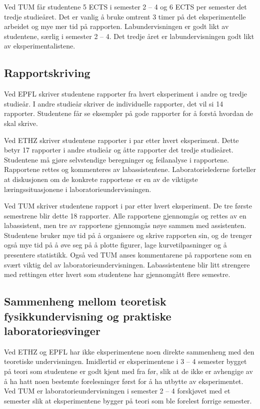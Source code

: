 \documentclass{article}
\begin{document}
Ved TUM får studentene 5 ECTS i semester 2 – 4 og 6 ECTS per semester det tredje studieåret. Det er vanlig å bruke omtrent 3 timer på det eksperimentelle arbeidet og mye mer tid på rapporten. Labundervisningen er godt likt av studentene, særlig i semester 2 – 4. Det tredje året er labundervisningen godt likt av eksperimentalistene. 

\subsection{Rapportskriving}
Ved EPFL skriver studentene rapporter fra hvert eksperiment i andre og tredje studieår. I andre studieår skriver de individuelle rapporter, det vil si 14 rapporter. Studentene får se eksempler på gode rapporter for å forstå hvordan de skal skrive. 

Ved ETHZ skriver studentene rapporter i par etter hvert eksperiment. Dette betyr 17 rapporter i andre studieår og åtte rapporter det tredje studieåret. Studentene må gjøre selvstendige beregninger og feilanalyse i rapportene. Rapportene rettes og kommenteres av labassistentene. Laboratorielederne forteller at diskusjonen om de konkrete rapportene er en av de viktigste læringssituasjonene i laboratorieundervisningen. 

Ved TUM skriver studentene rapport i par etter hvert eksperiment. De tre første semestrene blir dette 18 rapporter. Alle rapportene gjennomgås og rettes av en labassistent, men tre av rapportene gjennomgås nøye sammen med assistenten. Studentene bruker mye tid på å organisere og skrive rapporten sin, og de trenger også mye tid på å øve seg på å plotte figurer, lage kurvetilpasninger og å presentere statistikk. Også ved TUM anses kommentarene på rapportene som en svært viktig del av laboratorieundervisningen. Labassistentene blir litt strengere med rettingen etter hvert som studentene har gjennomgått flere semestre.  

\subsection{Sammenheng mellom teoretisk fysikkundervisning og praktiske laboratorieøvinger}

Ved ETHZ og EPFL har ikke eksperimentene noen direkte sammenheng med den teoretiske undervisningen. Imidlertid er eksperimentene i 3 – 4 semester bygget på teori som studentene er godt kjent med fra før, slik at de ikke er avhengige av å ha hatt noen bestemte forelesninger først for å ha utbytte av eksperimentet. Ved TUM er laboratorieundervisningen i semester 2 – 4 forskjøvet med et semester slik at eksperimentene bygger på teori som ble forelest forrige semester.
\end{document}

